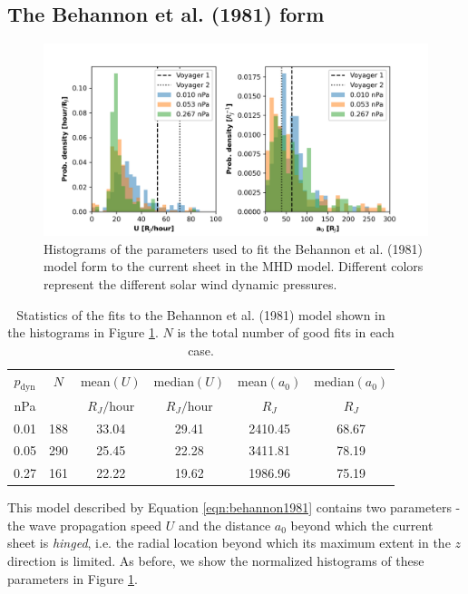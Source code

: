 \subsection{The Behannon et al. (1981) form}
\begin{figure}
    \centering
    \includegraphics[width=\textwidth]{images6/comparison_highdynP_behannon.png}
    \caption{Histograms of the parameters used to fit the Behannon et al. (1981) model form to the current sheet in the MHD model. Different colors represent the different solar wind dynamic pressures.}
    \label{fig:comparison-hist-behannon}
\end{figure}

\begin{table}
    \centering
    \begin{tabular}{c|c|c|c|c|c}
     $p_\text{dyn}$ &      $N$&  mean$(U)$&  median$(U)$&  mean$(a_0)$&  median$(a_0)$\\
     nPa&   &   $R_J/$hour& $R_J/$hour& $R_J$& $R_J$\\
     \hline
     0.01 & 188 &   33.04 &     29.41 &  2410.45 &      68.67 \\
     0.05 & 290 &   25.45 &     22.28 &  3411.81 &      78.19 \\
     0.27 & 161 &   22.22 &     19.62 &  1986.96 &      75.19 \\
    \end{tabular}
    \caption{Statistics of the fits to the Behannon et al. (1981) model shown in the histograms in Figure \protect\ref{fig:comparison-hist-behannon}. $N$ is the total number of good fits in each case.}
    \label{tab:comparison-behannon}
\end{table}

This model described by Equation \ref{eqn:behannon1981} contains two parameters - the wave propagation speed $U$ and the distance $a_0$ beyond which the current sheet is \emph{hinged}, i.e. the radial location beyond which its maximum extent in the $z$ direction is limited. As before, we show the normalized histograms of these parameters in Figure \ref{fig:comparison-hist-behannon}. 

